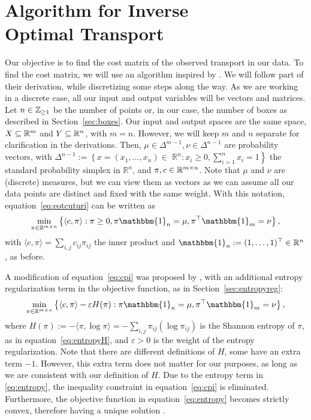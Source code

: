 \chapter[Algorithm for Inverse Optimal Transport]{Algorithm for Inverse \\Optimal Transport}
\label{ch:entropyregiOT}
Our objective is to find the cost matrix of the observed transport in our data. To find the cost matrix, we will use an algorithm inspired by \citet{ma2021}. We will follow part of their derivation, while discretizing some steps along the way. As we are working in a discrete case, all our input and output variables will be vectors and matrices. Let $n \in \mathbb{Z}_{\geq 1}$ be the number of points or, in our case, the number of boxes as described in Section~\ref{sec:boxes}. Our input and output spaces are the same space, $X \subseteq \mathbb{R}^m$ and $Y \subseteq \mathbb{R}^{n}$, with $m=n$. However, we will keep $m$ and $n$ separate for clarification in the derivations. Then, $\mu \in \Delta^{m-1}, \nu \in \Delta^{n-1}$ are probability vectors, with $\Delta^{n-1}:=\left\{x=\left(x_{1}, \ldots, x_{n}\right) \in\right.$ $\left.\mathbb{R}^{n}: x_{i} \geq 0, \sum_{i=1}^{n} x_{i}=1\right\}$ the standard probability simplex in $\mathbb{R}^{n}$, and $\pi, c \in \mathbb{R}^{m \times n}$. Note that $\mu$ and $\nu$ are (discrete) measures, but we can view them as vectors as we can assume all our data points are distinct and fixed with the same weight. With this notation, equation~\eqref{eq:eotcuturi} can be written as
\begin{equation}
	\min _{\pi \in \mathbb{R}^{m \times n}}\left\{\langle c, \pi\rangle: \pi \geq 0, \pi \mathbbm{1}_{n}=\mu, \pi^{\top} \mathbbm{1}_{m}=\nu\right\},
	\label{eq:cpi}
\end{equation}
with $\langle c, \pi\rangle =\sum_{i, j} c_{i j} \pi_{i j}$ the inner product and $\mathbbm{1}_{n}:=(1, \ldots, 1)^{\top} \in \mathbb{R}^{n}$, as before. \par 
A modification of equation~\eqref{eq:cpi} was proposed by \citet{cuturi2013}, with an additional entropy regularization term in the objective function, as in Section~\ref{sec:entropyreg}:
\begin{equation}
	\min _{\pi \in \mathbb{R}^{m \times n}}\left\{\langle c, \pi\rangle-\varepsilon H(\pi): \pi \mathbbm{1}_{n}=\mu, \pi^{\top} \mathbbm{1}_{m}=\nu\right\},
	\label{eq:entropy}
\end{equation}
where $H(\pi):=-\langle\pi, \log \pi\rangle=-\sum_{i, j} \pi_{i j}\left(\log \pi_{i j}\right)$ is the Shannon entropy of $\pi$, as in equation~\eqref{eq:entropyH}, and $\varepsilon>0$ is the weight of the entropy regularization. Note that there are different definitions of $H$, some have an extra term $-1$. However, this extra term does not matter for our purposes, as long as we are consistent with our definition of $H$. Due to the entropy term in \eqref{eq:entropy}, the inequality constraint in equation~\eqref{eq:cpi} is eliminated. Furthermore, the objective function in equation~\eqref{eq:entropy} becomes strictly convex, therefore having a unique solution \citep{ma2021}. \par 
